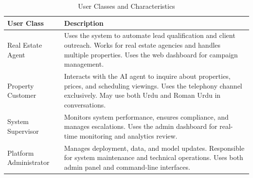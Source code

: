 \begin{table}[!htbp]
\centering
\caption{User Classes and Characteristics}
\label{tab:user-classes}
\renewcommand{\arraystretch}{1.3}
\begin{tabular}{|l|p{10cm}|}
\hline
\textbf{User Class} & \textbf{Description} \\ \hline
Real Estate Agent & Uses the system to automate lead qualification and client outreach. Works for real estate agencies and handles multiple properties. Uses the web dashboard for campaign management. \\ \hline
Property Customer & Interacts with the AI agent to inquire about properties, prices, and scheduling viewings. Uses the telephony channel exclusively. May use both Urdu and Roman Urdu in conversations. \\ \hline
System Supervisor & Monitors system performance, ensures compliance, and manages escalations. Uses the admin dashboard for real-time monitoring and analytics review. \\ \hline
Platform Administrator & Manages deployment, data, and model updates. Responsible for system maintenance and technical operations. Uses both admin panel and command-line interfaces. \\ \hline
\end{tabular}
\end{table}
